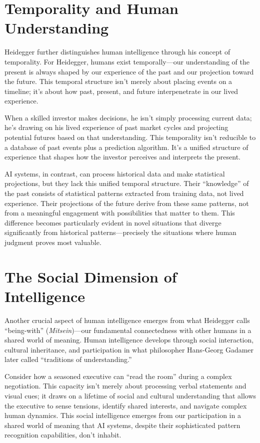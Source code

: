 \documentclass[
  Letterpaper,
]{scrbook}
\begin{document}
\section{Temporality and Human
Understanding}\label{temporality-and-human-understanding}

Heidegger further distinguishes human intelligence through his concept
of temporality. For Heidegger, humans exist temporally---our
understanding of the present is always shaped by our experience of the
past and our projection toward the future. This temporal structure isn't
merely about placing events on a timeline; it's about how past, present,
and future interpenetrate in our lived experience.

When a skilled investor makes decisions, he isn't simply processing
current data; he's drawing on his lived experience of past market cycles
and projecting potential futures based on that understanding. This
temporality isn't reducible to a database of past events plus a
prediction algorithm. It's a unified structure of experience that shapes
how the investor perceives and interprets the present.

AI systems, in contrast, can process historical data and make
statistical projections, but they lack this unified temporal structure.
Their ``knowledge'' of the past consists of statistical patterns
extracted from training data, not lived experience. Their projections of
the future derive from these same patterns, not from a meaningful
engagement with possibilities that matter to them. This difference
becomes particularly evident in novel situations that diverge
significantly from historical patterns---precisely the situations where
human judgment proves most valuable.

\section{The Social Dimension of
Intelligence}\label{the-social-dimension-of-intelligence}

Another crucial aspect of human intelligence emerges from what Heidegger
calls ``being-with'' (\emph{Mitsein})---our fundamental connectedness
with other humans in a shared world of meaning. Human intelligence
develops through social interaction, cultural inheritance, and
participation in what philosopher Hans-Georg Gadamer later called
``traditions of understanding.''

Consider how a seasoned executive can ``read the room'' during a complex
negotiation. This capacity isn't merely about processing verbal
statements and visual cues; it draws on a lifetime of social and
cultural understanding that allows the executive to sense tensions,
identify shared interests, and navigate complex human dynamics. This
social intelligence emerges from our participation in a shared world of
meaning that AI systems, despite their sophisticated pattern recognition
capabilities, don't inhabit.
\end{document}
